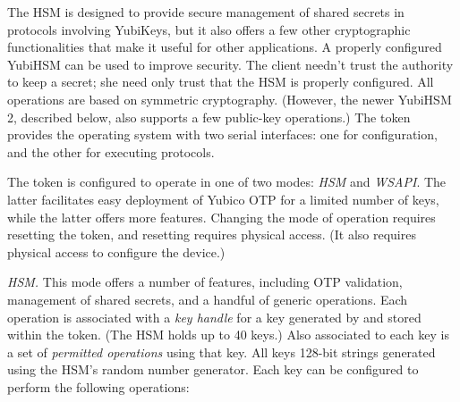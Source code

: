 %
The HSM is designed to provide secure management of shared secrets in protocols
involving YubiKeys, but it also offers a few other cryptographic functionalities
that make it useful for other applications. A properly configured YubiHSM can be
used to improve security. The client needn't trust the authority to keep a
secret; she need only trust that the HSM is properly configured.
%
%
All operations are based on
symmetric cryptography. (However, the newer YubiHSM 2, described below, also
supports a few public-key operations.)
%
The token provides the operating system with two serial interfaces: one for
configuration, and the other for executing protocols.
%

The token is configured to operate in one of two modes: \emph{HSM} and
\emph{WSAPI}. The latter facilitates easy deployment of Yubico OTP for a limited
number of keys, while the latter offers more features. Changing the mode of
operation requires resetting the token, and resetting requires physical access.
(It also requires physical access to configure the device.)

\textit{HSM.} This mode offers a number of features, including OTP validation,
management of shared secrets, and a handful of generic operations.
%
Each operation is associated with a \emph{key handle} for a key generated by and
stored within the token. (The HSM holds up to 40 keys.) Also associated to each
key is a set of \emph{permitted operations} using that key. All keys 128-bit
strings generated using the HSM's random number generator.
%
%
Each key can be configured to perform the following operations:

